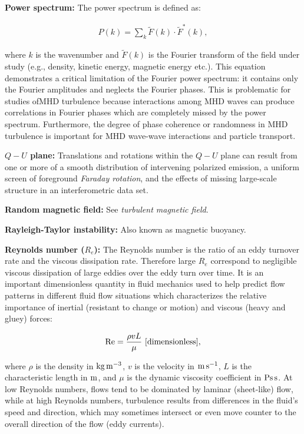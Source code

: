 \documentclass[a4paper,10pt]{article}
\begin{document}
{\noindent}\textbf{Power spectrum:} The power spectrum is defined as:

\begin{align*}
    P(k) = \sum_k \tilde{F}(k)\cdot\tilde{F}^*(k),
\end{align*}

{\noindent}where $k$ is the wavenumber and $\tilde{F}(k)$ is the Fourier transform of the field under study (e.g., density, kinetic energy, magnetic energy etc.). This equation demonstrates a critical limitation of the Fourier power spectrum: it contains only the Fourier amplitudes and neglects the Fourier phases. This is problematic for studies ofMHD turbulence because interactions among MHD waves can produce correlations in Fourier phases which are completely missed by the power spectrum. Furthermore, the degree of phase coherence or randomness in MHD turbulence is important for MHD wave-wave interactions and particle transport.

{\noindent}\textbf{$Q-U$ plane:} Translations and rotations within the $Q-U$ plane can result from one or more of a smooth distribution of intervening polarized emission, a uniform screen of foreground \textit{Faraday rotation}, and the effects of missing large-scale structure in an interferometric data set.

{\noindent}\textbf{Random magnetic field:} See \textit{turbulent magnetic field}. 

{\noindent}\textbf{Rayleigh-Taylor instability:} Also known as magnetic buoyancy.

{\noindent}\textbf{Reynolds number ($R_e$):}  The Reynolds number is the ratio of an eddy turnover rate and the viscous dissipation rate. Therefore large $R_e$ correspond to negligible viscous dissipation of large eddies over the eddy turn over time. It is an important dimensionless quantity in fluid mechanics used to help predict flow patterns in different fluid flow situations which characterizes the relative importance of inertial (resistant to change or motion) and viscous (heavy and gluey) forces:

\begin{align*}
    {\rm Re} = \frac{\rho vL}{\mu} ~ [{\rm dimensionless}],
\end{align*}

{\noindent}where $\rho$ is the density in ${\rm kg\,m^{-3}}$, $v$ is the velocity in ${\rm m\,s^{-1}}$, $L$ is the characteristic length in ${\rm m}$, and $\mu$ is the dynamic viscosity coefficient in ${\rm Ps\,s}$. At low Reynolds numbers, flows tend to be dominated by laminar (sheet-like) flow, while at high Reynolds numbers, turbulence results from differences in the fluid's speed and direction, which may sometimes intersect or even move counter to the overall direction of the flow (eddy currents).
\end{document}
